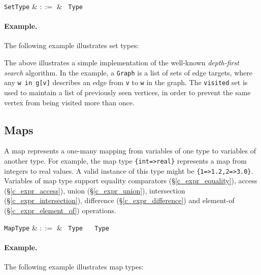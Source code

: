 \begin{syntax}
  \verb+SetType+ & $::=$ & \token{\{} \ \verb+Type+ \ \token{\}} \\
\end{syntax}

\paragraph{Example.} The following example illustrates set types:



The above illustrates a simple implementation of the well-known {\em depth-first search} algorithm.  In the example, a \lstinline{Graph} is a list of sets of edge targets, where any \lstinline{w in g[v]} describes an edge from \lstinline{v} to \lstinline{w} in the graph.  The \lstinline{visited} set is used to maintain a list of previously seen vertices, in order to prevent the same vertex from being visited more than once.  


\subsection{Maps}
\label{c_types_map}

A map represents a one-many mapping from variables of one type to variables of another type. For example, the map type \lstinline|{int=>real}| represents a map from integers to real values. A valid instance of this type might be \lstinline|{1=>1.2,2=>3.0}|.  Variables of map type support equality comparators (\S\ref{c_expr_equality}), access (\S\ref{c_expr_access}), union (\S\ref{c_expr_union}), intersection (\S\ref{c_expr_intersection}), difference (\S\ref{c_expr_difference}) and element-of (\S\ref{c_expr_element_of}) operations.

\begin{syntax}
  \verb+MapType+ & $::=$ & \token{\{} \ \verb+Type+ \ \token{=>} \ \verb+Type+ \ \token{\}} \\
\end{syntax}

\paragraph{Example.} The following example illustrates map types:

